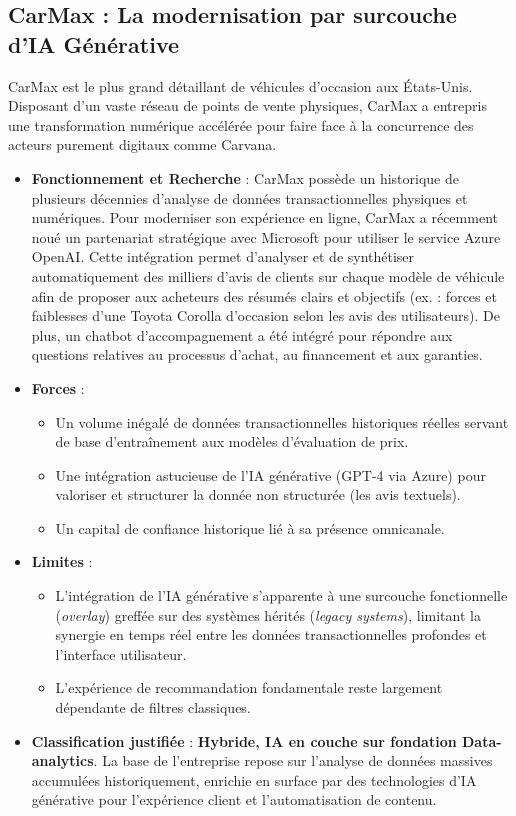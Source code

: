 \documentclass[11pt,a4paper]{article}
\begin{document}
\subsection{CarMax : La modernisation par surcouche d'IA Générative}
CarMax est le plus grand détaillant de véhicules d'occasion aux États-Unis. Disposant d'un vaste réseau de points de vente physiques, CarMax a entrepris une transformation numérique accélérée pour faire face à la concurrence des acteurs purement digitaux comme Carvana.

\begin{itemize}
    \item \textbf{Fonctionnement et Recherche} : CarMax possède un historique de plusieurs décennies d'analyse de données transactionnelles physiques et numériques. Pour moderniser son expérience en ligne, CarMax a récemment noué un partenariat stratégique avec Microsoft pour utiliser le service Azure OpenAI. Cette intégration permet d'analyser et de synthétiser automatiquement des milliers d'avis de clients sur chaque modèle de véhicule afin de proposer aux acheteurs des résumés clairs et objectifs (ex. : forces et faiblesses d'une Toyota Corolla d'occasion selon les avis des utilisateurs). De plus, un chatbot d'accompagnement a été intégré pour répondre aux questions relatives au processus d'achat, au financement et aux garanties.
    \item \textbf{Forces} :
    \begin{itemize}
        \item Un volume inégalé de données transactionnelles historiques réelles servant de base d'entraînement aux modèles d'évaluation de prix.
        \item Une intégration astucieuse de l'IA générative (GPT-4 via Azure) pour valoriser et structurer la donnée non structurée (les avis textuels).
        \item Un capital de confiance historique lié à sa présence omnicanale.
    \end{itemize}
    \item \textbf{Limites} :
    \begin{itemize}
        \item L'intégration de l'IA générative s'apparente à une surcouche fonctionnelle (\textit{overlay}) greffée sur des systèmes hérités (\textit{legacy systems}), limitant la synergie en temps réel entre les données transactionnelles profondes et l'interface utilisateur.
        \item L'expérience de recommandation fondamentale reste largement dépendante de filtres classiques.
    \end{itemize}
    \item \textbf{Classification justifiée} : \textbf{Hybride, IA en couche sur fondation Data-analytics}. La base de l'entreprise repose sur l'analyse de données massives accumulées historiquement, enrichie en surface par des technologies d'IA générative pour l'expérience client et l'automatisation de contenu.
\end{itemize}
\end{document}
